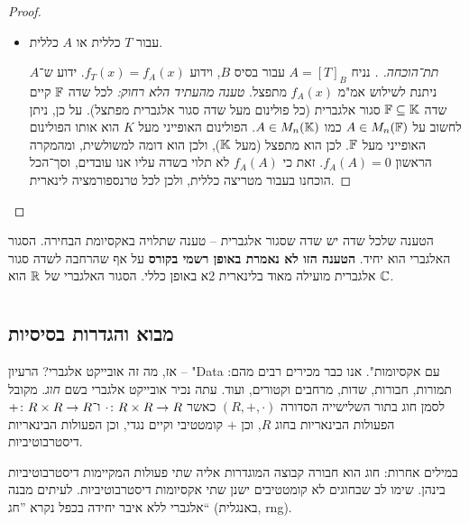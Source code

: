 \documentclass[name=רשימות אלגברה לינארית 2א]{../../../tex/classes/megasumPreamble}
\begin{document}
\begin{proof}
\begin{itemize}
\begin{proof}[תת־הוכחה.]
				אם $A$ ניתנת לשילוש, אז היא דומה למשולשית, והן בעלות אותו הפולינום האופייני. אז חזרה לתחילת ההוכחה. 
			\end{proof}
			\item עבור $T$ כללית או $A$ כללית. \begin{proof}[תת־הוכחה. ]
				נניח $A = [T]_B$ עבור בסיס $B$, וידוע $f_T(x) = f_A(x)$. ידוע ש־$A$ ניתנת לשילוש אמ"מ $f_A(x)$ מתפצל. \textit{טענה מהעתיד הלא רחוק: }לכל שדה $\mathbb{F}$ קיים שדה $\mathbb{F} \subseteq \mathbb{K}$ סגור אלגברית (כל פולינום מעל שדה סגור אלגברית מפתצל). על כן, ניתן לחשוב על $A \in M_n(\mathbb{F})$ כמו $A \in M_n(\mathbb{K})$. הפולינום האופייני מעל $K$ הוא אותו הפולינום האופייני מעל $\mathbb{F}$. לכן הוא מתפצל (מעל $\mathbb{K}$), ולכן הוא דומה למשולשית, ומהמקרה הראשון $f_A(A) = 0$. זאת כי $f_A(A)$ לא תלוי בשדה עליו אנו עובדים, וסך־הכל הוכחנו בעבור מטריצה כללית, ולכן לכל טרנספורמציה לינארית. 
			\end{proof}
		\end{itemize}
	\end{proof}
	
	
	\begin{Remark}
		הטענה שלכל שדה יש שדה שסגור אלגברית – טענה שתלויה באקסיומת הבחירה. הסגור האלגברי הוא יחיד. \textbf{הטענה הזו לא נאמרת באופן רשמי בקורס} על אף שהרחבה לשדה סגור אלגברית מועילה מאוד בלינארית 2א באופן כללי. הסגור האלגברי של $\mathbb{R}$ הוא $\mathbb{C}$. 
	\end{Remark}
	
	\npage
	\section[תורת החוגים]{}
	\subsection{מבוא והגדרות בסיסיות}
	אז, מה זה אובייקט אלגברי? הרעיון – "Data עם אקסיומות". אנו כבר מכירים רבים מהם: תמורות, חבורות, שדות, מרחבים וקטורים, ועוד. עתה נכיר אובייקט אלגברי בשם \textit{חוג}. מקובל לסמן חוג בתור השלישייה הסדורה $(R, +, \cdot)$ כאשר $\cdot \colon R\times R \to R$ ו־$+ \colon R\times R \to R$ הפעולות הבינאריות בחוג $R$, וכן $+$ קומטטיבי וקיים נגדי, וכן הפעולות הבינאריות דיסטרבוטיביות. 
	
	במילים אחרות: חוג הוא חבורה קבוצה המוגדרות אליה שתי פעולות המקיימות דיסטרבוטיביות בינהן. שימו לב שבחוגים לא קומטטיבים ישנן שתי אקסיומות דיסטרבוטיביות. לעיתים מבנה אלגברי ללא איבר יחידה בכפל נקרא ''חג`` (באנגלית, rng). 
	
\end{document}
